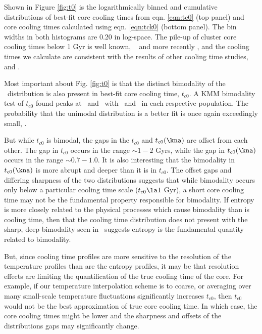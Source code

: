 \documentclass[apj]{emulateapj}
\begin{document}
Shown in Figure \ref{fig:t0} is the logarithmically binned and
cumulative distributions of best-fit core cooling times from
eqn. \ref{eqn:tc0} (top panel) and core cooling times calculated using
eqn. \ref{eqn:tck0} (bottom panel). The bin widths in both histograms
are 0.20 in log-space. The pile-up of cluster core cooling times below
1 Gyr is well known, \eg\ \citep{hu85} and more recently
\citet{dunn08}, and the cooling times we calculate are consistent with
the results of other cooling time studies, \eg\
\citet{1998MNRAS.298..416P} and \citet{2008arXiv0802.1864R}.

Most important about Fig. \ref{fig:t0} is that the distinct bimodality
of the \kna\ distribution is also present in best-fit core cooling
time, $t_{c0}$. A KMM bimodality test of $t_{c0}$ found peaks at
\tckmma\ and \tckmmb\ with \tckmmc\ and \tckmmd\ in each respective
population. The probability that the unimodal distribution is a better
fit is once again exceedingly small, \tckmme.

But while $t_{c0}$ is bimodal, the gaps in the $t_{c0}$ and
$t_{c0}(\kna)$ are offset from each other. The gap in $t_{c0}$ occurs
in the range $\sim 1-2$ Gyrs, while the gap in $t_{c0}(\kna)$ occurs
in the range $\sim 0.7-1.0$. It is also interesting that the
bimodality in $t_{c0}(\kna)$ is more abrupt and deeper than it is in
$t_{c0}$. The offset gaps and differing sharpness of the two
distributions suggests that while bimodality occurs only below a
particular cooling time scale ($t_{c0} \la 1$ Gyr), a short core
cooling time may not be the fundamental property responsible for
bimodality. If entropy is more closely related to the physical
processes which cause bimodality than is cooling time, then that the
cooling time distribution does not present with the sharp, deep
bimodality seen in \kna\ suggests entropy is the fundamental quantity
related to bimodality.

But, since cooling time profiles are more sensitive to the resolution
of the temperature profiles than are the entropy profiles, it may be
that resolution effects are limiting the quantification of the true
cooling time of the core. For example, if our temperature
interpolation scheme is to coarse, or averaging over many small-scale
temperature fluctuations significantly increases $t_{c0}$, then
$t_{c0}$ would not be the best approximation of true core cooling
time. In which case, the core cooling times might be lower and the
sharpness and offsets of the distributions gaps may significantly
change.
\end{document}
